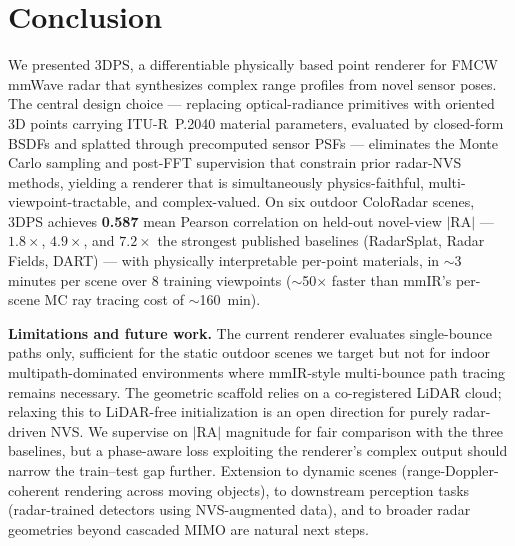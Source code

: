 \section{Conclusion}
\label{sec:conclusion}

We presented 3DPS, a differentiable physically based point renderer for FMCW mmWave radar that synthesizes complex range profiles from novel sensor poses. The central design choice --- replacing optical-radiance primitives with oriented 3D points carrying ITU-R~P.2040 material parameters, evaluated by closed-form BSDFs and splatted through precomputed sensor PSFs --- eliminates the Monte Carlo sampling and post-FFT supervision that constrain prior radar-NVS methods, yielding a renderer that is simultaneously physics-faithful, multi-viewpoint-tractable, and complex-valued. On six outdoor ColoRadar scenes, 3DPS achieves \textbf{0.587} mean Pearson correlation on held-out novel-view $|\mathrm{RA}|$ --- $1.8\!\times$, $4.9\!\times$, and $7.2\!\times$ the strongest published baselines (RadarSplat, Radar Fields, DART) --- with physically interpretable per-point materials, in ${\sim}$3 minutes per scene over 8 training viewpoints (${\sim}$50$\times$ faster than mmIR's per-scene MC ray tracing cost of ${\sim}$160~min).

\textbf{Limitations and future work.} The current renderer evaluates single-bounce paths only, sufficient for the static outdoor scenes we target but not for indoor multipath-dominated environments where mmIR-style multi-bounce path tracing remains necessary. The geometric scaffold relies on a co-registered LiDAR cloud; relaxing this to LiDAR-free initialization is an open direction for purely radar-driven NVS. We supervise on $|\mathrm{RA}|$ magnitude for fair comparison with the three baselines, but a phase-aware loss exploiting the renderer's complex output should narrow the train--test gap further. Extension to dynamic scenes (range-Doppler-coherent rendering across moving objects), to downstream perception tasks (radar-trained detectors using NVS-augmented data), and to broader radar geometries beyond cascaded MIMO are natural next steps.
